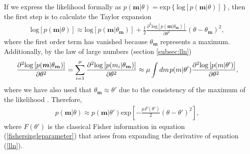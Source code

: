 If we express the likelihood formally as $p(\boldsymbol{m}|\theta) = \mathrm{exp}{\left\lbrace \mathrm{log} \left[p(\boldsymbol{m}|\theta)\right]\right\rbrace}$, then the first step is to calculate the Taylor expansion
\begin{eqnarray}
\mathrm{log} \left[p(\boldsymbol{m}|\theta)\right] \approx \mathrm{log} \left[p(\boldsymbol{m}|\theta_{\boldsymbol{m}})\right] + \frac{1}{2} \frac{\partial^2 \mathrm{log} \left[p(\boldsymbol{m}|\theta_{\boldsymbol{m}})\right]}{\partial \theta^2} (\theta - \theta_{\boldsymbol{m}})^2,
\end{eqnarray}
where the first order term has vanished because $\theta_{\boldsymbol{m}}$ represents a maximum. Additionally, by the law of large numbers (section \ref{subsec:lln})
\begin{eqnarray}
\frac{\partial^2\mathrm{log} \left[p(\boldsymbol{m}|\theta_{\boldsymbol{m}})\right]}{\partial \theta^2} = \sum_{i=1}^{\mu} \frac{\partial^2 \mathrm{log} \left[p(m_i|\theta_{\boldsymbol{m}})\right]}{\partial \theta^2}\approx  \mu\int dm\hspace{0.1em} p(m|\theta')\frac{\partial^2 \mathrm{log} \left[p(m|\theta')\right]}{\partial \theta^2},
\label{lln}
\end{eqnarray}
where we have also used that $\theta_{\boldsymbol{m}} \approx \theta'$ due to the consistency of the maximum of the likelihood \cite{cox2000, kay1993, pezze2014}. Therefore,
\begin{align}
p(\boldsymbol{m}|\theta) \approx p(\boldsymbol{m}|\theta')\mathrm{exp} \left[ -\frac{\mu F(\theta')}{2}\left(\theta - \theta'\right)^2 \right],
\label{gaussian_likelihood}
\end{align}
where $F(\theta')$ is the classical Fisher information in equation (\ref{fishersingleparameter}) that arises from expanding the derivative of equation (\ref{lln}). 

